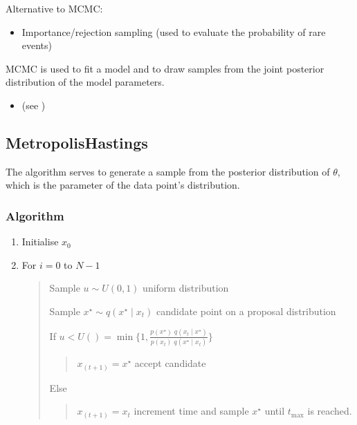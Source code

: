 \documentclass[a4paper,12pt,english]{sphinxhowto}
\begin{document}
Alternative to MCMC:
\begin{itemize}
\item {} 
Importance/rejection sampling (used to evaluate the probability of rare events)

\end{itemize}


MCMC is used to fit a model and to draw samples from the joint posterior distribution of the model parameters.
\begin{itemize}
\item {} 
(see {\hyperref[\detokenize{MCMC:bayes}]{}})

\end{itemize}



\subsection{Metropolis\sphinxhyphen{}Hastings}
\label{\detokenize{MCMC:metropolis-hastings}}
The  algorithm serves to generate a sample from the posterior distribution
of \(\theta\), which is the parameter of the data point’s distribution.



\subsubsection{Algorithm}
\label{\detokenize{MCMC:algorithm}}\begin{enumerate}
%
\item {} 
Initialise \(x_0\)

\item {} 
For \(i=0\) to \(N-1\)
\begin{quote}

Sample \(u \sim U(0, 1)\)  uniform distribution

Sample \(x^\star \sim q(x^\star \mid x_t)\)  candidate point on a proposal distribution

If \(u < U() = \min\{1, \frac{p(x^\star) \; q(x_t \mid x^\star)}{p(x_t) \; q(x^\star \mid x_t)}\}\)
\begin{quote}

\(x_{(t+1)} = x^\star\)  accept candidate
\end{quote}

Else
\begin{quote}

\(x_{(t+1)} = x_t\)  increment time and sample \(x^\star\) until \(t_{\max}\) is reached.
\end{quote}
\end{quote}

\end{enumerate}
\end{document}
